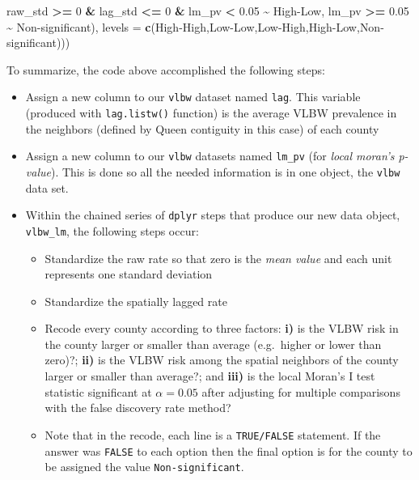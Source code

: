 \documentclass[
]{book}
\newenvironment{Shaded}{\begin{snugshade}}{\end{snugshade}}
\newcommand{\AttributeTok}[1]{\textcolor[rgb]{0.13,0.29,0.53}{#1}}
\newcommand{\DecValTok}[1]{\textcolor[rgb]{0.00,0.00,0.81}{#1}}
\newcommand{\FloatTok}[1]{\textcolor[rgb]{0.00,0.00,0.81}{#1}}
\newcommand{\FunctionTok}[1]{\textcolor[rgb]{0.13,0.29,0.53}{\textbf{#1}}}
\newcommand{\NormalTok}[1]{#1}
\newcommand{\SpecialCharTok}[1]{\textcolor[rgb]{0.81,0.36,0.00}{\textbf{#1}}}
\newcommand{\StringTok}[1]{\textcolor[rgb]{0.31,0.60,0.02}{#1}}
\providecommand{\tightlist}{%
  \setlength{\itemsep}{0pt}\setlength{\parskip}{0pt}}
\begin{document}
\begin{Shaded}
\begin{Highlighting}[]
\NormalTok{            raw\_std }\SpecialCharTok{\textgreater{}=} \DecValTok{0} \SpecialCharTok{\&}\NormalTok{ lag\_std }\SpecialCharTok{\textless{}=} \DecValTok{0} \SpecialCharTok{\&}\NormalTok{ lm\_pv }\SpecialCharTok{\textless{}} \FloatTok{0.05} \SpecialCharTok{\textasciitilde{}} \StringTok{\textquotesingle{}High{-}Low\textquotesingle{}}\NormalTok{,}
\NormalTok{            lm\_pv }\SpecialCharTok{\textgreater{}=} \FloatTok{0.05} \SpecialCharTok{\textasciitilde{}} \StringTok{\textquotesingle{}Non{-}significant\textquotesingle{}}\NormalTok{),}
           \AttributeTok{levels =} \FunctionTok{c}\NormalTok{(}\StringTok{\textquotesingle{}High{-}High\textquotesingle{}}\NormalTok{,}\StringTok{\textquotesingle{}Low{-}Low\textquotesingle{}}\NormalTok{,}\StringTok{\textquotesingle{}Low{-}High\textquotesingle{}}\NormalTok{,}\StringTok{\textquotesingle{}High{-}Low\textquotesingle{}}\NormalTok{,}\StringTok{\textquotesingle{}Non{-}significant\textquotesingle{}}\NormalTok{)))}
\end{Highlighting}
\end{Shaded}

To summarize, the code above accomplished the following steps:

\begin{itemize}
\tightlist
\item
  Assign a new column to our \texttt{vlbw} dataset named \texttt{lag}. This variable (produced with \texttt{lag.listw()} function) is the average VLBW prevalence in the neighbors (defined by Queen contiguity in this case) of each county
\item
  Assign a new column to our \texttt{vlbw} datasets named \texttt{lm\_pv} (for \emph{local moran's p-value}). This is done so all the needed information is in one object, the \texttt{vlbw} data set.
\item
  Within the chained series of \texttt{dplyr} steps that produce our new data object, \texttt{vlbw\_lm}, the following steps occur:

  \begin{itemize}
  \tightlist
  \item
    Standardize the raw rate so that zero is the \emph{mean value} and each unit represents one standard deviation
  \item
    Standardize the spatially lagged rate
  \item
    Recode every county according to three factors: \textbf{i)} is the VLBW risk in the county larger or smaller than average (e.g.~higher or lower than zero)?; \textbf{ii)} is the VLBW risk among the spatial neighbors of the county larger or smaller than average?; and \textbf{iii)} is the local Moran's I test statistic significant at \(\alpha = 0.05\) after adjusting for multiple comparisons with the false discovery rate method?
  \item
    Note that in the recode, each line is a \texttt{TRUE/FALSE} statement. If the answer was \texttt{FALSE} to each option then the final option is for the county to be assigned the value \texttt{\textquotesingle{}Non-significant\textquotesingle{}}.
  \end{itemize}
\end{itemize}
\end{document}
